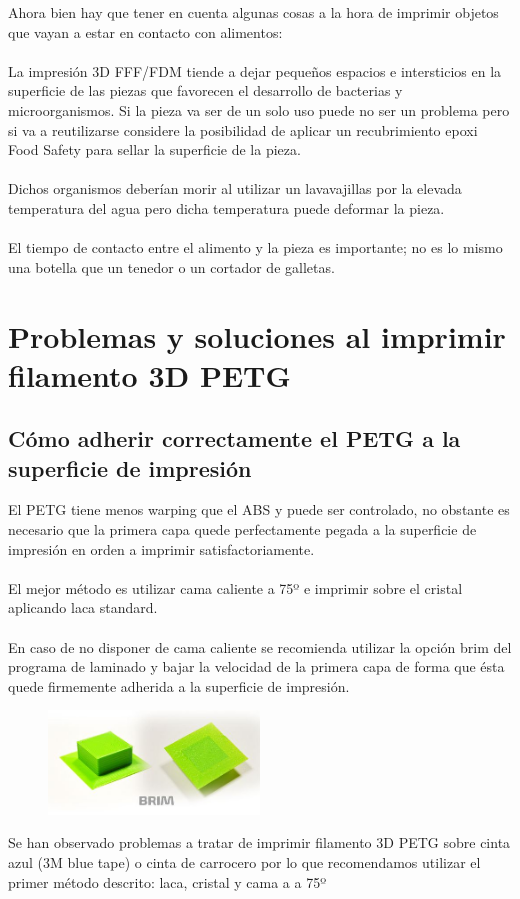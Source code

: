 \documentclass[11pt,a4paper]{article}
\begin{document}
Ahora bien hay que tener en cuenta algunas cosas a la hora de imprimir objetos que vayan a estar en contacto con alimentos:
\\\\
La impresión 3D FFF/FDM tiende a dejar pequeños espacios e intersticios en la superficie de las piezas que favorecen el desarrollo de bacterias y microorganismos. Si la pieza va ser de un solo uso puede no ser un problema pero si va a reutilizarse considere la posibilidad de aplicar un recubrimiento epoxi Food Safety para sellar la superficie de la pieza. 
\\\\
Dichos organismos deberían morir al utilizar un lavavajillas por la elevada temperatura del agua pero dicha temperatura puede deformar la pieza.
\\\\
El tiempo de contacto entre el alimento y la pieza es importante; no es lo mismo una botella que un tenedor o un cortador de galletas.
\section{Problemas y soluciones al imprimir filamento 3D PETG}
	\subsection{Cómo adherir correctamente el PETG a la superficie de impresión}El PETG tiene menos warping que el ABS y puede ser controlado, no obstante es necesario que la primera capa quede perfectamente pegada a la superficie de impresión en orden a imprimir satisfactoriamente.
\\\\
El mejor método es utilizar cama caliente a 75º e imprimir sobre el cristal aplicando laca standard.
\\\\
En caso de no disponer de cama caliente se recomienda utilizar la opción brim del programa de laminado y bajar la velocidad de la primera capa de forma que ésta quede firmemente adherida a la superficie de impresión.
\begin{figure}[H]
\centering
\includegraphics[width=0.5\textwidth,cfbox=azul_marcos 1pt 0pt]{FOTOS/BRIM}
\end{figure}
Se han observado problemas a tratar de imprimir filamento 3D PETG sobre cinta azul (3M blue tape) o cinta de carrocero por lo que recomendamos utilizar el primer método descrito: laca, cristal y cama a a 75º
\end{document}
